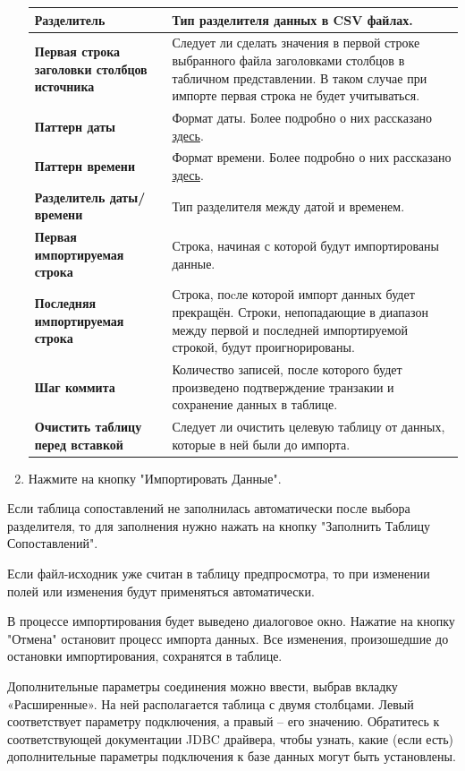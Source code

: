 \begin{enumerate}
\begin{longtable}[r]{|>{\bfseries}m{3.9cm}|m{11cm}|}
		\hline
		Разделитель & Тип разделителя данных в CSV файлах.\\\hline
		Первая строка заголовки столбцов источника & Следует ли сделать значения в первой строке выбранного файла заголовками столбцов в табличном представлении. В таком случае при импорте первая строка не будет учитываться.\\\hline
		Паттерн даты & Формат даты. Более подробно о них рассказано \hyperlink{tab:datapattern}{здесь}.\\\hline
		Паттерн времени & Формат времени. Более подробно о них рассказано \hyperlink{tab:datapattern}{здесь}.\\\hline
		Разделитель даты/времени & Тип разделителя между датой и временем.\\\hline
		Первая импортируемая строка & Строка, начиная с которой будут импортированы данные.\\\hline
		Последняя импортируемая строка & Строка, поcле которой импорт данных будет прекращён. Строки, непопадающие в диапазон между первой и последней импортируемой строкой, будут проигнорированы.\\\hline
		Шаг коммита & Количество записей, после которого будет произведено подтверждение транзакии и сохранение данных в таблице.\\\hline
		Очистить таблицу перед вставкой & Следует ли очистить целевую таблицу от данных, которые в ней были до импорта.\\\hline
	\end{longtable}
	\item Нажмите на кнопку "Импортировать Данные".
\end{enumerate}

Если таблица сопоставлений не заполнилась автоматически после выбора разделителя, то для заполнения нужно нажать на кнопку "Заполнить Таблицу Сопоставлений".	

Если файл-исходник уже считан в таблицу предпросмотра, то при изменении полей  или  изменения будут применяться автоматически.

В процессе импортирования будет выведено диалоговое окно. Нажатие на кнопку "Отмена" остановит процесс импорта данных. Все изменения, произошедшие до остановки импортирования, сохранятся в таблице.


Дополнительные параметры соединения можно ввести, выбрав вкладку «Расширенные». На ней располагается таблица с двумя столбцами. Левый соответствует параметру подключения, а правый -- его значению. Обратитесь к соответствующей документации JDBC драйвера, чтобы узнать, какие (если есть) дополнительные параметры подключения к базе данных могут быть установлены.

